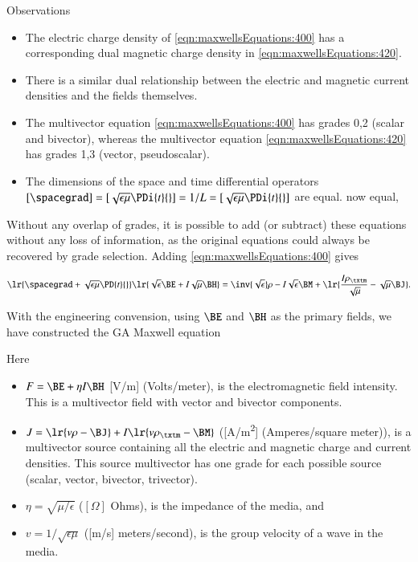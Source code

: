 Observations
\begin{itemize}
\item
The electric charge density of \cref{eqn:maxwellsEquations:400} has a corresponding dual magnetic charge density in \cref{eqn:maxwellsEquations:420}.
\item
There is a similar dual relationship between the electric and magnetic current densities and the fields themselves.
\item
The multivector equation \cref{eqn:maxwellsEquations:400} has grades 0,2 (scalar and bivector), whereas the multivector equation \cref{eqn:maxwellsEquations:420} has grades 1,3 (vector, pseudoscalar).
\item
The
dimensions of the space and time differential operators \( [\spacegrad] = [\sqrt{\epsilon\mu} \PDi{t}{}] = 1/L = [\sqrt{\epsilon\mu}\PDi{t}{}]\) are equal.
now equal,
\end{itemize}

Without any overlap of grades, it is possible to add (or subtract) these equations without any loss of information, as
the original equations could always be recovered by grade selection.
Adding \cref{eqn:maxwellsEquations:400} gives

\begin{dmath}\label{eqn:maxwellsEquations:440}
\lr{ \spacegrad + \sqrt{\epsilon\mu} \PD{t}{} }
\lr{ \sqrt{\epsilon} \BE
+
I \sqrt{\mu} \BH
}
=
\inv{\sqrt{\epsilon}} \rho
- I \sqrt{\epsilon} \BM
+\lr{
\frac{I \rho_\txtm}{\sqrt{\mu}}
- \sqrt{\mu} \BJ
}
.
\end{dmath}

With the engineering convension, using \( \BE \) and \( \BH \) as the primary fields, we have constructed the GA Maxwell equation


Here

\begin{itemize}
\item \( F = \BE + \eta I \BH \) [\si{V/m}] (Volts/meter), is the electromagnetic field intensity.  This is a multivector field with vector and bivector components.
\item \( J = \lr{ v \rho - \BJ } + I \lr{ v \rho_\txtm - \BM } \) ([\si{A/m^2}] (Amperes/square meter)),
is a multivector source containing all the electric and magnetic charge and current densities.  This source multivector has one grade for each possible source (scalar, vector, bivector, trivector).
\item \( \eta = \sqrt{\mu/\epsilon} \) (\( [\Omega] \) Ohms), is the impedance of the media, and
\item \( v = 1/\sqrt{\epsilon\mu} \) ([\si{m/s}] meters/second), is the group velocity of a wave in the media.
\end{itemize}

